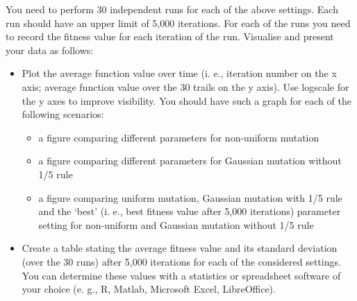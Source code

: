\documentclass{article}
\begin{document}
You need to perform 30 independent runs for each of the above settings. Each run should have an
upper limit of 5,000 iterations. For each of the runs you need to record the fitness value for each
iteration of the run. Visualise and present your data as follows:

\begin{itemize}
	\item Plot the average function value over time (i. e., iteration number on the x axis; average function
value over the 30 trails on the y axis). Use logscale for the y axes to improve visibility. You
should have such a graph for each of the following scenarios:
	\begin{itemize}
		\item a figure comparing different parameters for non-uniform mutation
		\item a figure comparing different parameters for Gaussian mutation without 1/5 rule
		\item a figure comparing uniform mutation, Gaussian mutation with 1/5 rule and the ‘best’
(i. e., best fitness value after 5,000 iterations) parameter setting for non-uniform and
Gaussian mutation without 1/5 rule
	\end{itemize}
	
	\item Create a table stating the average fitness value and its standard deviation (over the 30 runs)
after 5,000 iterations for each of the considered settings. You can determine these values
with a statistics or spreadsheet software of your choice (e. g., R, Matlab, Microsoft Excel,
LibreOffice).

\end{itemize}
\end{document}
